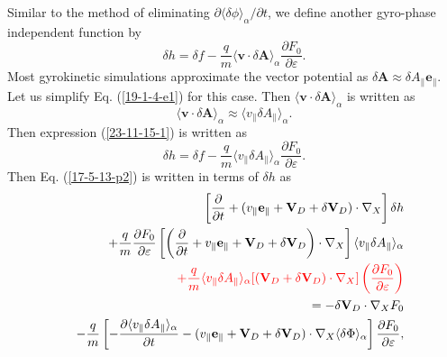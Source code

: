 \documentclass{article}
\newcommand{\tmcolor}[2]{{\color{#1}{#2}}}
\begin{document}
Similar to the method of eliminating $\partial \langle \delta \phi
\rangle_{\alpha} / \partial t$, we define another gyro-phase independent
function by
\begin{equation}
  \label{23-11-15-1} \delta h = \delta f - \frac{q}{m} \langle \mathbf{v}
  \cdot \delta \mathbf{A} \rangle_{\alpha} \frac{\partial F_0}{\partial
  \varepsilon} .
\end{equation}
Most gyrokinetic simulations approximate the vector potential as $\delta
\mathbf{A} \approx \delta A_{\parallel} \mathbf{e}_{\parallel}$. Let us
simplify Eq. (\ref{19-1-4-e1}) for this case. Then $\langle \mathbf{v} \cdot
\delta \mathbf{A} \rangle_{\alpha}$ is written as
\begin{equation}
  \label{19-3-26-e1} \langle \mathbf{v} \cdot \delta \mathbf{A}
  \rangle_{\alpha} \approx \langle v_{\parallel} \delta A_{\parallel}
  \rangle_{\alpha} .
\end{equation}
Then expression (\ref{23-11-15-1}) is written as
\begin{equation}
  \delta h = \delta f - \frac{q}{m} \langle v_{\parallel} \delta A_{\parallel}
  \rangle_{\alpha} \frac{\partial F_0}{\partial \varepsilon} .
\end{equation}
Then Eq. (\ref{17-5-13-p2}) is written in terms of $\delta h$ as
\begin{eqnarray}
  &  & \left[ \frac{\partial}{\partial t} + (v_{\parallel}
  \mathbf{e}_{\parallel} +\mathbf{V}_D + \delta \mathbf{V}_D) \cdot \nabla_X
  \right] \delta h \nonumber\\
  &  & + \frac{q}{m}  \frac{\partial F_0}{\partial \varepsilon} \left[ \left(
  \frac{\partial}{\partial t} + v_{\parallel} \mathbf{e}_{\parallel}
  +\mathbf{V}_D + \delta \mathbf{V}_D \right) \cdot \nabla_X \right] \langle
  v_{\parallel} \delta A_{\parallel} \rangle_{\alpha} \nonumber\\
  &  & \tmcolor{red}{+ \frac{q}{m} \langle v_{\parallel} \delta A_{\parallel}
  \rangle_{\alpha} [(\mathbf{V}_D + \delta \mathbf{V}_D) \cdot \nabla_X]
  \left( \frac{\partial F_0}{\partial \varepsilon} \right)} \nonumber\\
  &  & = - \delta \mathbf{V}_D \cdot \nabla_X F_0 \nonumber\\
  &  & - \frac{q}{m} \left[ - \frac{\partial \langle v_{\parallel} \delta
  A_{\parallel} \rangle_{\alpha}}{\partial t} - (v_{\parallel}
  \mathbf{e}_{\parallel} +\mathbf{V}_D + \delta \mathbf{V}_D) \cdot \nabla_X
  \langle \delta \Phi \rangle_{\alpha} \right] \frac{\partial F_0}{\partial
  \varepsilon}, 
\end{eqnarray}
\end{document}
